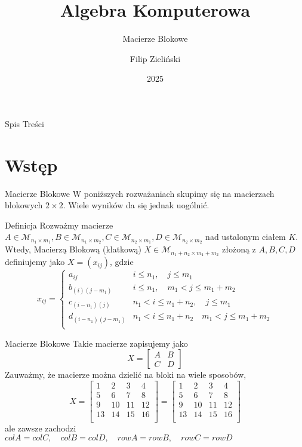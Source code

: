 \documentclass{beamer}
\title{Algebra Komputerowa}
\subtitle{Macierze Blokowe}
\author{Filip Zieli\'nski}
\date{2025}
\begin{document}
\begin{frame}
\titlepage
\end{frame}
 
\begin{frame}{Spis Treści}
    \tableofcontents
\end{frame}

\section{Wstęp} 

\begin{frame}{Macierze Blokowe}
    W poniższych rozważaniach skupimy się na macierzach blokowych $2 \times 2$. Wiele wyników da się jednak uogólnić.
    \begin{block}{Definicja}
        Rozważmy macierze $A \in \mathcal{M}_{n_1 \times m_1}, B \in \mathcal{M}_{n_1 \times m_2}, C \in \mathcal{M}_{n_2 \times m_1}, D \in \mathcal{M}_{n_2 \times m_2}$ nad ustalonym ciałem $K$.
        Wtedy, \alert{Macierzą Blokową} (klatkową) $X \in \mathcal{M}_{n_1 + n_2 \times m_1 + m_2}$ złożoną z  $A,B,C,D$ definiujemy jako $X = (x_{ij})$, gdzie 
        $$x_{ij} = \begin{cases}
            a_{ij} & i \leq n_1 , \quad  j \leq m_1 \\ 
            b_{(i)(j-m_1)} &  i \leq n_1 , \quad m_1 < j \leq m_1 + m_2 \\
            c_{(i-n_1)(j)} & n_1 < i \leq n_1 + n_2, \quad j \leq m_1 \\
            d_{(i-n_1)(j-m_1)} & n_1 < i \leq n_1 + n_2 \quad  m_1 < j \leq m_1 + m_2 \\
        \end{cases}$$
    \end{block}    
\end{frame}

\begin{frame}{Macierze Blokowe}
    Takie macierze zapisujemy jako
    $$ X = \begin{bmatrix}
        A & B \\
        C & D
    \end{bmatrix}$$
    Zauważmy, że macierze można dzielić na bloki na wiele sposobów, 
    $$X = \left[ \begin{array}{ccc|c}
        1 & 2 & 3 & 4 \\ \hline 
        5 & 6 & 7 & 8 \\ 
        9 & 10 & 11 & 12 \\ 
        13 & 14 & 15 & 16 \\
    \end{array}\right] =  \left[ \begin{array}{cc|cc}
        1 & 2 & 3 & 4 \\ 
        5 & 6 & 7 & 8 \\ \hline 
        9 & 10 & 11 & 12 \\ 
        13 & 14 & 15 & 16 \\
    \end{array}\right] $$
    ale zawsze zachodzi $colA = colC, \quad colB = colD,\quad  rowA = rowB, \quad rowC = rowD$
\end{frame}
\end{document}
